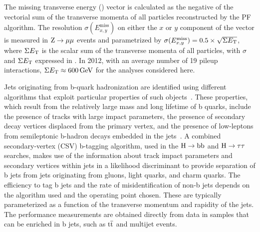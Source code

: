 \documentclass[11pt,twoside,a4paper,cmspaper,final,collab]{cms-tdr}
\begin{document}
The missing transverse energy (\MET)  vector is calculated as the negative of the vectorial sum of the transverse momenta of all particles reconstructed by the PF algorithm.
The resolution $\sigma(E_{x,y}^{\text{miss}})$ on either the $x$ or $y$ component of the \MET vector is measured in $\mathrm{Z}\to\mu\mu$ events
and parametrized by $\sigma(E_{x,y}^{\text{miss}})=0.5\times\sqrt{{\Sigma {\ensuremath{E_{\mathrm{T}}}}}}$,
where $\Sigma {\ensuremath{E_{\mathrm{T}}}}$ is the scalar sum of the transverse momenta of all particles, with
$\sigma$ and $\Sigma {\ensuremath{E_{\mathrm{T}}}}$ expressed in \GeVns{}.
In 2012, with an average number of 19 pileup interactions, $\Sigma {\ensuremath{E_{\mathrm{T}}}}\approx 600\,\text{Ge\hspace{-.08em}V}$ for the analyses considered here.

Jets originating from b-quark hadronization are identified using different algorithms that exploit
 particular properties of such objects~\cite{CMS-PAS-BTV-12-001}.
These properties, which result from the relatively large mass and long lifetime of b quarks,
include the presence of tracks with large impact parameters, the presence of secondary decay vertices displaced from
the primary vertex, and the
 presence of low-\PT leptons from semileptonic b-hadron decays
 embedded in the jets~\cite{CMS-PAS-BTV-12-001}.
A combined secondary-vertex (CSV) b-tagging algorithm, used in the $\mathrm{H}\to\mathrm{b}\mathrm{b}$ and $\mathrm{H}\to\tau\tau$ searches,
makes use of the information about track impact parameters and secondary vertices within jets in a likelihood discriminant to provide separation
of b jets from jets originating from gluons, light quarks, and charm quarks.
The efficiency to tag b jets and the rate of misidentification of non-b jets depends on the algorithm used and the
operating point chosen. These are typically parameterized as a function of the transverse momentum and rapidity of the jets.
The performance measurements are obtained directly from data in samples that can be enriched in b jets,
such as $\mathrm{t}\overline{\mathrm{t}}$ and multijet events.
\end{document}
